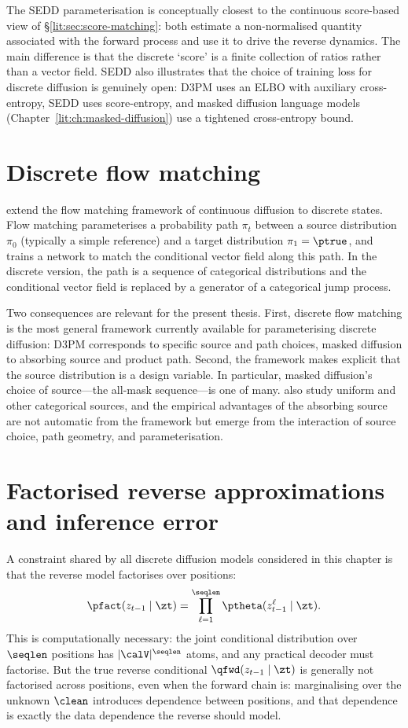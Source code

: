 The SEDD parameterisation is conceptually closest to the continuous
score-based view of \S\ref{lit:sec:score-matching}: both estimate a
non-normalised quantity associated with the forward process and use it to
drive the reverse dynamics. The main difference is that the discrete
`score' is a finite collection of ratios rather than a vector field. SEDD
also illustrates that the choice of training loss for discrete diffusion is
genuinely open: D3PM uses an ELBO with auxiliary cross-entropy, SEDD uses
score-entropy, and masked diffusion language models
(Chapter~\ref{lit:ch:masked-diffusion}) use a tightened cross-entropy
bound.

\section{Discrete flow matching}
\label{lit:sec:dfm}

\textcite{gat2024dfm} extend the flow matching framework of continuous
diffusion to discrete states. Flow matching parameterises a probability path
$\pi_t$ between a source distribution $\pi_0$ (typically a simple reference)
and a target distribution $\pi_1=\ptrue$, and trains a network to match the
conditional vector field along this path. In the discrete version, the path
is a sequence of categorical distributions and the conditional vector field
is replaced by a generator of a categorical jump process.

Two consequences are relevant for the present thesis. First, discrete flow
matching is the most general framework currently available for
parameterising discrete diffusion: D3PM corresponds to specific source and
path choices, masked diffusion to absorbing source and product path. Second,
the framework makes explicit that the source distribution is a design
variable. In particular, masked diffusion's choice of source---the all-mask
sequence---is one of many. \textcite{gat2024dfm} also study uniform and
other categorical sources, and the empirical advantages of the absorbing
source are not automatic from the framework but emerge from the interaction
of source choice, path geometry, and parameterisation.

\section{Factorised reverse approximations and inference error}
\label{lit:sec:factorization}

A constraint shared by all discrete diffusion models considered in this
chapter is that the reverse model factorises over positions:
\[
  \pfact(z_{t-1}\mid \zt)
  = \prod_{\ell=1}^{\seqlen}\ptheta(z_{t-1}^\ell\mid \zt).
\]
This is computationally necessary: the joint conditional distribution over
$\seqlen$ positions has $|\calV|^{\seqlen}$ atoms, and any practical decoder
must factorise. But the true reverse conditional $\qfwd(z_{t-1}\mid \zt)$ is
generally not factorised across positions, even when the forward chain is:
marginalising over the unknown $\clean$ introduces dependence between
positions, and that dependence is exactly the data dependence the reverse
should model.

